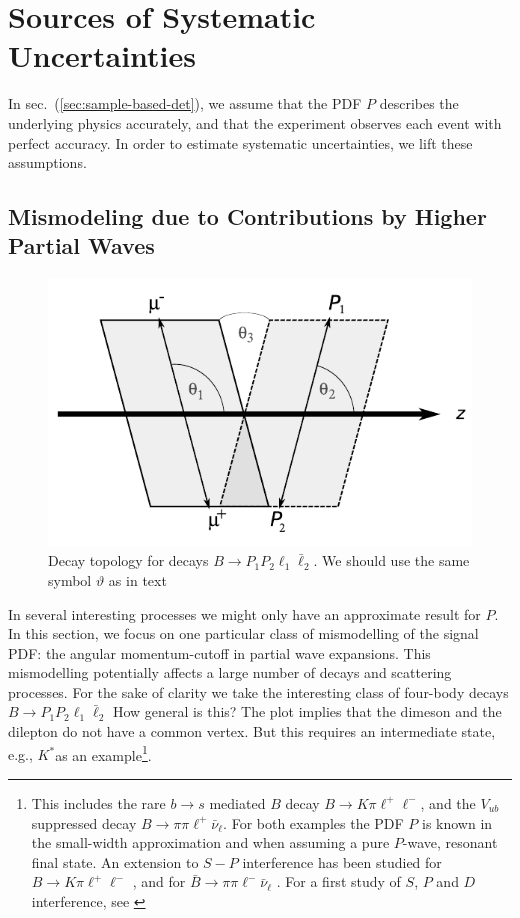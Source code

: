 \documentclass[aps,prd,reprint,nofootinbib,preprintnumbers]{revtex4}
\newcommand{\refsec}[1]{sec.~(\ref{sec:#1})}
\renewcommand{\theta}{\vartheta}
\newcommand{\fred}[1]{{\color{brown!85!black}#1}}
\begin{document}
\section{Sources of Systematic Uncertainties}
\label{sec:systematics}

In \refsec{sample-based-det}, we assume that the PDF $P$ describes the underlying physics accurately,
and that the experiment observes each event with perfect accuracy. In order to estimate systematic
uncertainties, we lift these assumptions.

\subsection{Mismodeling due to Contributions by Higher Partial Waves}
\label{sec:systematics:partial-waves}

\begin{figure}
    \includegraphics[width=.6\textwidth]{fig-topology.pdf}
    \caption{Decay topology for decays $B\to P_1 P_2 \ell_1 \bar\ell_2$. \label{fig:topology}\fred{We should use the same symbol $\theta$ as in text}}
\end{figure}

In several interesting processes we might only have an approximate
result for $P$.  In this section, we focus on one particular class of
mismodelling of the signal PDF: the angular momentum-cutoff in partial
wave expansions. This mismodelling potentially affects a large number
of decays and scattering processes. For the sake of clarity we take
the interesting class of four-body decays $B\to P_1 P_2 \ell_1
\bar\ell_2$ \fred{How general is this? The plot implies that the
  dimeson and the dilepton do not have a common vertex. But this
  requires an intermediate state, e.g., $K^{*}$}as an
example\footnote{This includes the rare $b\to s$ mediated $B$ decay $B
  \to K\pi\ell^+\ell^-$, and the $V_{ub}$ suppressed decay $B\to
  \pi\pi\ell^+\bar\nu_\ell$. For both examples the PDF $P$ is known in
  the small-width approximation and when assuming a pure $P$-wave,
  resonant final state. An extension to $S-P$ interference has been
  studied for $B\to K\pi\ell^+\ell^-$
  \cite{Blake:2012mb,Becirevic:2011bp}, and for $\bar{B}\to
  \pi\pi\ell^-\bar\nu_\ell$ \cite{Faller:2013dwa}. For a first study
  of $S$, $P$
  and $D$ interference, see \cite{Das:2014sra}}.\\
\end{document}
